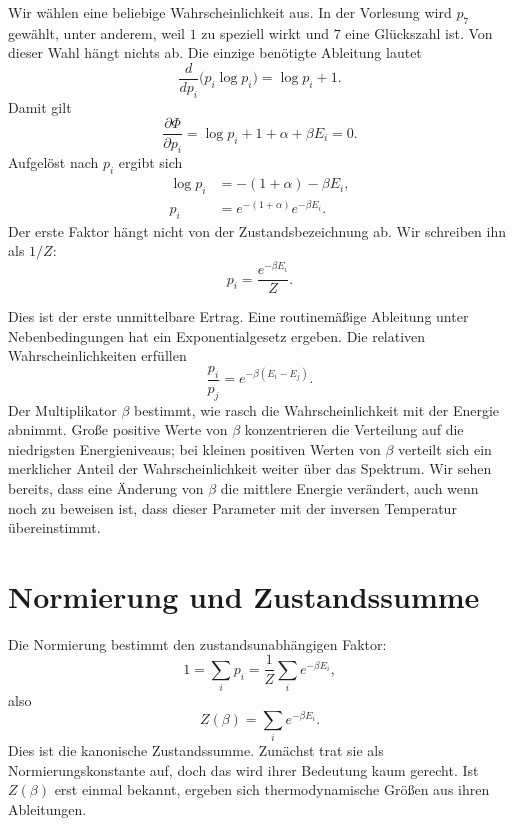 Wir wählen eine beliebige Wahrscheinlichkeit aus. In der Vorlesung wird \(p_7\) gewählt, unter anderem, weil \(1\) zu speziell wirkt und \(7\) eine Glückszahl ist. Von dieser Wahl hängt nichts ab. Die einzige benötigte Ableitung lautet
\begin{equation}
 \frac{d}{dp_i}\bigl(p_i\log p_i\bigr)=\log p_i+1.
\end{equation}
Damit gilt
\begin{equation}
 \frac{\partial\Phi}{\partial p_i}
 =\log p_i+1+\alpha+\beta E_i=0.
 \label{eq:sm4-stationarity}
\end{equation}
Aufgelöst nach \(p_i\) ergibt sich
\begin{align}
 \log p_i&=-(1+\alpha)-\beta E_i,\\
 p_i&=e^{-(1+\alpha)}e^{-\beta E_i}.
\end{align}
Der erste Faktor hängt nicht von der Zustandsbezeichnung ab. Wir schreiben ihn als \(1/Z\):
\begin{equation}
 p_i=\frac{e^{-\beta E_i}}{Z}.
 \label{eq:sm4-boltzmann-weight}
\end{equation}

Dies ist der erste unmittelbare Ertrag. Eine routinemäßige Ableitung unter Nebenbedingungen hat ein Exponentialgesetz ergeben. Die relativen Wahrscheinlichkeiten erfüllen
\begin{equation}
 \frac{p_i}{p_j}=e^{-\beta(E_i-E_j)}.
 \label{eq:sm4-relative-weight}
\end{equation}
Der Multiplikator \(\beta\) bestimmt, wie rasch die Wahrscheinlichkeit mit der Energie abnimmt. Große positive Werte von \(\beta\) konzentrieren die Verteilung auf die niedrigsten Energieniveaus; bei kleinen positiven Werten von \(\beta\) verteilt sich ein merklicher Anteil der Wahrscheinlichkeit weiter über das Spektrum. Wir sehen bereits, dass eine Änderung von \(\beta\) die mittlere Energie verändert, auch wenn noch zu beweisen ist, dass dieser Parameter mit der inversen Temperatur übereinstimmt.

\section{Normierung und Zustandssumme}

Die Normierung bestimmt den zustandsunabhängigen Faktor:
\begin{equation}
 1=\sum_i p_i
 =\frac{1}{Z}\sum_i e^{-\beta E_i},
\end{equation}
also
\begin{equation}
 Z(\beta)=\sum_i e^{-\beta E_i}.
 \label{eq:sm4-partition-function}
\end{equation}
Dies ist die kanonische Zustandssumme. Zunächst trat sie als Normierungskonstante auf, doch das wird ihrer Bedeutung kaum gerecht. Ist \(Z(\beta)\) erst einmal bekannt, ergeben sich thermodynamische Größen aus ihren Ableitungen.

